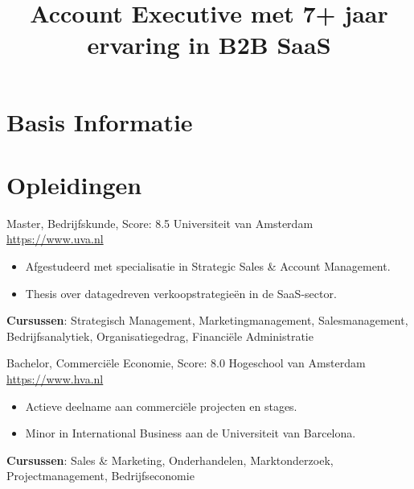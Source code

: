 \documentclass[a4paper, serif, 10pt]{moderncv}
\title{Account Executive met 7+ jaar ervaring in B2B SaaS}
\begin{document}
\maketitle

\section{Basis Informatie}

\section{Opleidingen}

        {Master, Bedrijfskunde, Score: 8.5}
        {Universiteit van Amsterdam}
        {\url{https://www.uva.nl}}
        {}
        {\begin{itemize}
\item Afgestudeerd met specialisatie in Strategic Sales \& Account Management.
\item Thesis over datagedreven verkoopstrategieën in de SaaS-sector.
\end{itemize}
\textbf{Cursussen}: Strategisch Management, Marketingmanagement, Salesmanagement, Bedrijfsanalytiek, Organisatiegedrag, Financiële Administratie}

        {Bachelor, Commerciële Economie, Score: 8.0}
        {Hogeschool van Amsterdam}
        {\url{https://www.hva.nl}}
        {}
        {\begin{itemize}
\item Actieve deelname aan commerciële projecten en stages.
\item Minor in International Business aan de Universiteit van Barcelona.
\end{itemize}
\textbf{Cursussen}: Sales \& Marketing, Onderhandelen, Marktonderzoek, Projectmanagement, Bedrijfseconomie}
\end{document}

